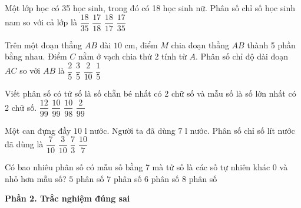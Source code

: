 \begin{ex} %
Một lớp học có 35 học sinh, trong đó có 18 học sinh nữ. Phân số chỉ số học sinh nam so với cả lớp là
\choice
{$\dfrac{18}{35}$}
{$\dfrac{17}{18}$}
{$\dfrac{18}{17}$}
{\True $\dfrac{17}{35}$}
\end{ex}

\begin{ex} %
Trên một đoạn thẳng $AB$ dài $10\text{ cm}$, điểm $M$ chia đoạn thẳng $AB$ thành 5 phần bằng nhau. Điểm $C$ nằm ở vạch chia thứ 2 tính từ $A$. Phân số chỉ độ dài đoạn $AC$ so với $AB$ là
\choice
{\True $\dfrac{2}{5}$}
{$\dfrac{3}{5}$}
{$\dfrac{2}{10}$}
{$\dfrac{1}{5}$}
\end{ex}

\begin{ex} %
Viết phân số có tử số là số chẵn bé nhất có 2 chữ số và mẫu số là số lớn nhất có 2 chữ số.
\choice
{$\dfrac{12}{99}$}
{\True $\dfrac{10}{99}$}
{$\dfrac{10}{98}$}
{$\dfrac{2}{99}$}
\end{ex}

\begin{ex} %
Một can đựng đầy $10\text{ l}$ nước. Người ta đã dùng $7\text{ l}$ nước. Phân số chỉ số lít nước đã dùng là
\choice
{\True $\dfrac{7}{10}$}
{$\dfrac{3}{10}$}
{$\dfrac{7}{3}$}
{$\dfrac{10}{7}$}
\end{ex}

\begin{ex} %
Có bao nhiêu phân số có mẫu số bằng 7 mà tử số là các số tự nhiên khác 0 và nhỏ hơn mẫu số?
\choice
{$5$ phân số}
{$7$ phân số}
{\True $6$ phân số}
{$8$ phân số}
\end{ex}

\textbf{Phần 2. Trắc nghiệm đúng sai}

